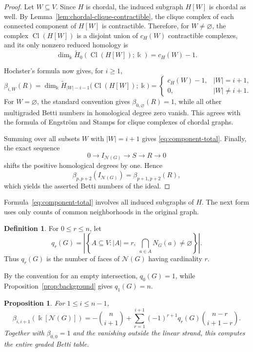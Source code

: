 \documentclass[11pt]{amsart}
\newtheorem{proposition}[theorem]{Proposition}
\theoremstyle{definition}
\newtheorem{definition}[theorem]{Definition}
\theoremstyle{remark}
\numberwithin{equation}{section}
\newcommand{\NN}{\mathcal N}
\newcommand{\Cl}{\operatorname{Cl}}
\begin{document}
	\begin{proof}
		Let \(W\subseteq V\). Since \(H\) is chordal, the induced subgraph \(H[W]\)
		is chordal as well. By Lemma~\ref{lem:chordal-clique-contractible}, the clique
		complex of each connected component of \(H[W]\) is contractible. Therefore,
		for \(W\ne\varnothing\), the complex \(\Cl(H[W])\) is a disjoint union of
		\(c_H(W)\) contractible complexes, and its only nonzero reduced homology is
		\[
		\dim_{\Bbbk}\widetilde H_0(\Cl(H[W]);\Bbbk)=c_H(W)-1.
		\]
		
		Hochster's formula \cite{Hochster1977} now gives, for \(i\ge1\),
		\[
		\beta_{i,W}(R)
		=
		\dim_{\Bbbk}\widetilde H_{|W|-i-1}
		\bigl(\Cl(H[W]);\Bbbk\bigr)
		=
		\begin{cases}
			c_H(W)-1,&|W|=i+1,\\
			0,&|W|\ne i+1.
		\end{cases}
		\]
		For \(W=\varnothing\), the standard convention gives
		\(\beta_{0,\varnothing}(R)=1\), while all other multigraded Betti numbers in
		homological degree zero vanish. This agrees with the formula of Engstr\"om and
		Stamps \cite{EngstromStamps2013} for clique complexes of chordal
		graphs.
		
		Summing over all subsets \(W\) with \(|W|=i+1\) gives
		\eqref{eq:component-total}. Finally, the exact sequence
		\[
		0\longrightarrow I_{\NN(G)}\longrightarrow S\longrightarrow R
		\longrightarrow0
		\]
		shifts the positive homological degrees by one. Hence
		\[
		\beta_{p,p+2}(I_{\NN(G)})=\beta_{p+1,p+2}(R),
		\]
		which yields the asserted Betti numbers of the ideal.
	\end{proof}
	
	Formula~\eqref{eq:component-total} involves all induced subgraphs of \(H\).
	The next form uses only counts of common neighborhoods in the original graph.
	
	\begin{definition}
		For \(0\le r\le n\), let
		\[
		q_r(G)=
		\left|
		\left\{
		A\subseteq V:
		|A|=r,\ 
		\bigcap_{a\in A}N_G(a)\ne\varnothing
		\right\}
		\right|.
		\]
		Thus \(q_r(G)\) is the number of faces of \(\NN(G)\) having
		cardinality \(r\).
	\end{definition}
	
	By the convention for an empty intersection, \(q_0(G)=1\), while
	Proposition~\ref{prop:background} gives \(q_1(G)=n\).
	
	\begin{proposition}\label{prop:q-formula}
		For \(1\le i\le n-1\),
		\begin{equation}\label{eq:q-formula}
			\beta_{i,i+1}(\Bbbk[\NN(G)])
			=
			-\binom n{i+1}
			+\sum_{r=1}^{i+1}
			(-1)^{r+1}q_r(G)
			\binom{n-r}{i+1-r}.
		\end{equation}
		Together with \(\beta_{0,0}=1\) and the vanishing outside the linear strand,
		this computes the entire graded Betti table.
	\end{proposition}
	
\end{document}
